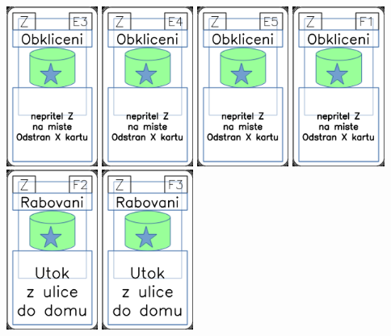 \documentclass[a4paper]{article}
\begin{document}
	\includegraphics[width=3.0cm]{img-5_52}
	\includegraphics[width=3.0cm]{img-5_53}
	\includegraphics[width=3.0cm]{img-5_54}
	\includegraphics[width=3.0cm]{img-5_55}
	\includegraphics[width=3.0cm]{img-5_56}
	\includegraphics[width=3.0cm]{img-5_57}
\end{document}
